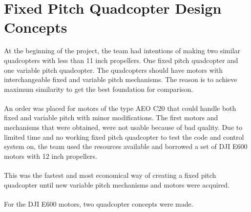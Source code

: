 \section{Fixed Pitch Quadcopter Design Concepts}
At the beginning of the project, the team had intentions of making two similar quadcopters with less than 11 inch propellers. One fixed pitch quadcopter and one variable pitch quadcopter. The quadcopters should have motors with interchangeable fixed and variable pitch mechanisms. The reason is to achieve maximum similarity to get the best foundation for comparison. 
\\\\
An order was placed for motors of the type AEO C20 that could handle both fixed and variable pitch with minor modifications. The first motors and mechanisms that were obtained, were not usable because of bad quality. Due to limited time and no working fixed pitch quadcopter to test the code and control system on, the team used the resources available and borrowed a set of DJI E600 motors with 12 inch propellers.
\\\\
This was the fastest and most economical way of creating a fixed pitch quadcopter until new variable pitch mechanisms and motors were acquired.
\\\\
For the DJI E600 motors, two quadcopter concepts were made. 
